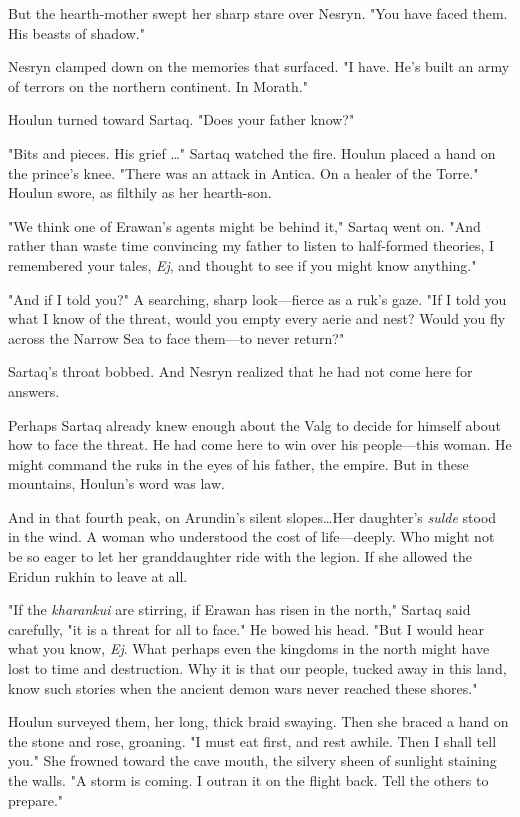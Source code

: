 But the hearth-mother swept her sharp stare over Nesryn.
"You have faced them.
His beasts of shadow."

Nesryn clamped down on the memories that surfaced.
"I have.
He's built an army of terrors on the northern continent.
In Morath."

Houlun turned toward Sartaq.
"Does your father know?"

"Bits and pieces.
His grief \ldots" Sartaq watched the fire.
Houlun placed a hand on the prince's knee.
"There was an attack in Antica.
On a healer of the Torre."
Houlun swore, as filthily as her hearth-son.

"We think one of Erawan's agents might be behind it," Sartaq went on.
"And rather than waste time convincing my father to listen to half-formed theories, I remembered your tales, \emph{Ej}, and thought to see if you might know anything."

"And if I told you?"
A searching, sharp look---fierce as a ruk's gaze.
"If I told you what I know of the threat, would you empty every aerie and nest?
Would you fly across the Narrow Sea to face them---to never return?"

Sartaq's throat bobbed.
And Nesryn realized that he had not come here for answers.

Perhaps Sartaq already knew enough about the Valg to decide for himself about how to face the threat.
He had come here to win over his people---this woman.
He might command the ruks in the eyes of his father, the empire.
But in these mountains, Houlun's word was law.

And in that fourth peak, on Arundin's silent slopes\ldots Her daughter's \emph{sulde} stood in the wind.
A woman who understood the cost of life---deeply.
Who might not be so eager to let her granddaughter ride with the legion.
If she allowed the Eridun rukhin to leave at all.

"If the \emph{kharankui} are stirring, if Erawan has risen in the north," Sartaq said carefully, "it is a threat for all to face."
He bowed his head.
"But I would hear what you know, \emph{Ej}.
What perhaps even the kingdoms in the north might have lost to time and destruction.
Why it is that our people, tucked away in this land, know such stories when the ancient demon wars never reached these shores."

Houlun surveyed them, her long, thick braid swaying.
Then she braced a hand on the stone and rose, groaning.
"I must eat first, and rest awhile.
Then I shall tell you."
She frowned toward the cave mouth, the silvery sheen of sunlight staining the walls.
"A storm is coming.
I outran it on the flight back.
Tell the others to prepare."

